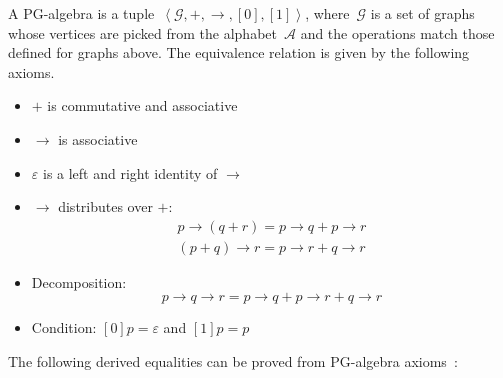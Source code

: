 A PG-algebra is a tuple~$\left\langle \mathcal{G},+,\rightarrow,[0],[1]\right\rangle $,
where~$\mathcal{G}$ is a set of graphs whose vertices are picked
from the alphabet~$\mathcal{A}$ and the operations match those
defined for graphs above. The equivalence relation is given by the
following axioms.
\begin{itemize}
\item $+$ is commutative and associative
\item $\rightarrow$ is associative
\item $\varepsilon$ is a left and right identity of $\rightarrow$
\item $\rightarrow$ distributes over $+$:\vspace{-0.3em}
\[
\begin{array}{c}
p\rightarrow(q+r)=p\rightarrow q+p\rightarrow r\\
(p+q)\rightarrow r=p\rightarrow r+q\rightarrow r
\end{array}
\]

\item Decomposition: \vspace{-0.3em}
\[
p\rightarrow q\rightarrow r=p\rightarrow q+p\rightarrow r+q\rightarrow r
\]

\item Condition: $[0]p=\varepsilon$ and $[1]p=p$
\end{itemize}
The following derived equalities can be proved from PG-algebra axioms~\cite[Prop. 2, 3]{2011_mokhov_pg}:

